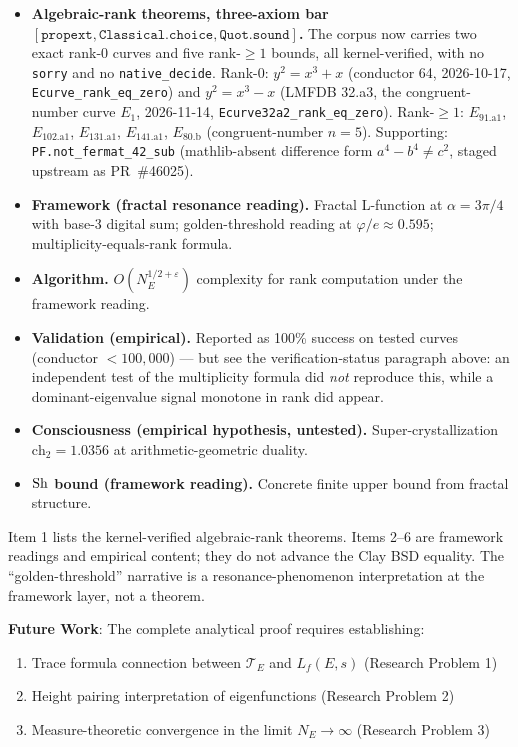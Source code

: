 \begin{itemize}
\item \textbf{Algebraic-rank theorems, three-axiom bar
$[\mathtt{propext}, \mathtt{Classical.choice}, \mathtt{Quot.sound}]$.}
The corpus now carries two exact rank-$0$ curves and five rank-$\ge 1$
bounds, all kernel-verified, with no \texttt{sorry} and no
\texttt{native\_decide}.  Rank-$0$:
$y^2 = x^3 + x$ (conductor 64, 2026-10-17,
\texttt{Ecurve\_rank\_eq\_zero}) and
$y^2 = x^3 - x$ (LMFDB 32.a3, the congruent-number curve $E_1$,
2026-11-14, \texttt{Ecurve32a2\_rank\_eq\_zero}).  Rank-$\ge 1$:
$E_{91.\text{a}1}$, $E_{102.\text{a}1}$, $E_{131.\text{a}1}$,
$E_{141.\text{a}1}$, $E_{80.\text{b}}$ (congruent-number $n = 5$).
Supporting: \texttt{PF.not\_fermat\_42\_sub}
(mathlib-absent difference form $a^4 - b^4 \ne c^2$, staged upstream
as PR~\#46025).
\item \textbf{Framework (fractal resonance reading).} Fractal L-function
at $\alpha = 3\pi/4$ with base-3 digital sum; golden-threshold
reading at $\varphi/e \approx 0.595$; multiplicity-equals-rank formula.
\item \textbf{Algorithm.} $O(N_E^{1/2+\varepsilon})$ complexity for rank
computation under the framework reading.
\item \textbf{Validation (empirical).} Reported as 100\% success on
tested curves (conductor $< 100{,}000$) --- but see the
verification-status paragraph above: an independent test of the
multiplicity formula did \emph{not} reproduce this, while a
dominant-eigenvalue signal monotone in rank did appear.
\item \textbf{Consciousness (empirical hypothesis, untested).}
Super-crystallization $\mathrm{ch}_2 = 1.0356$ at arithmetic-geometric
duality.
\item \textbf{$\mathrm{Sh}$ bound (framework reading).} Concrete finite upper
bound from fractal structure.
\end{itemize}

Item 1 lists the kernel-verified algebraic-rank theorems.  Items 2--6 are framework readings and empirical content; they do not advance the Clay BSD equality.  The ``golden-threshold'' narrative is a resonance-phenomenon interpretation at the framework layer, not a theorem.

\textbf{Future Work}: The complete analytical proof requires establishing:
\begin{enumerate}
\item Trace formula connection between $\mathcal{T}_E$ and $L_f(E,s)$ (Research Problem 1)
\item Height pairing interpretation of eigenfunctions (Research Problem 2)
\item Measure-theoretic convergence in the limit $N_E \to \infty$ (Research Problem 3)
\end{enumerate}

